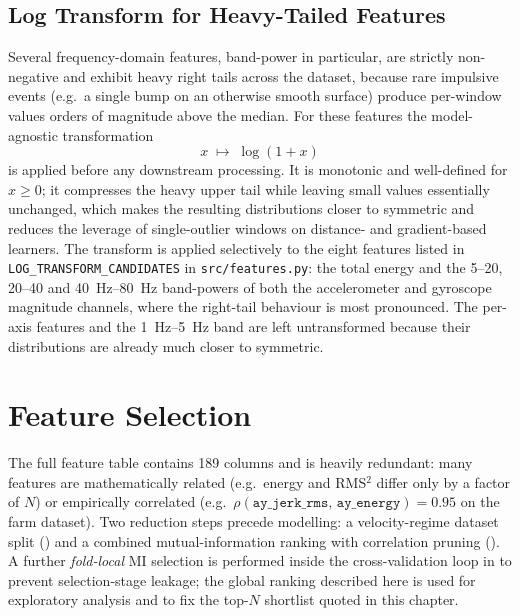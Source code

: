 \subsection{Log Transform for Heavy-Tailed Features}

Several frequency-domain features, band-power in particular, are strictly non-negative and exhibit heavy right tails across the dataset, because rare impulsive events (e.g.\ a single bump on an otherwise smooth surface) produce per-window values orders of magnitude above the median. For these features the model-agnostic transformation
\begin{equation}
    x \;\mapsto\; \log(1 + x)
    \label{eq:log1p}
\end{equation}
is applied before any downstream processing. It is monotonic and well-defined for $x \ge 0$; it compresses the heavy upper tail while leaving small values essentially unchanged, which makes the resulting distributions closer to symmetric and reduces the leverage of single-outlier windows on distance- and gradient-based learners. The transform is applied selectively to the eight features listed in \texttt{LOG\_TRANSFORM\_CANDIDATES} in \texttt{src/features.py}: the total energy and the \SIrange{5}{20}{}, \SIrange{20}{40}{} and \SIrange{40}{80}{\hertz} band-powers of both the accelerometer and gyroscope magnitude channels, where the right-tail behaviour is most pronounced. The per-axis features and the \SIrange{1}{5}{\hertz} band are left untransformed because their distributions are already much closer to symmetric.

\section{Feature Selection}
\label{sec:feat_selection}

The full feature table contains 189 columns and is heavily redundant: many features are mathematically related (e.g.\ energy and RMS$^2$ differ only by a factor of $N$) or empirically correlated (e.g.\ $\rho(\texttt{ay\_jerk\_rms},\,\texttt{ay\_energy}) = 0.95$ on the farm dataset). Two reduction steps precede modelling: a velocity-regime dataset split () and a combined mutual-information ranking with correlation pruning (). A further \emph{fold-local} MI selection is performed inside the cross-validation loop in  to prevent selection-stage leakage; the global ranking described here is used for exploratory analysis and to fix the top-$N$ shortlist quoted in this chapter.

